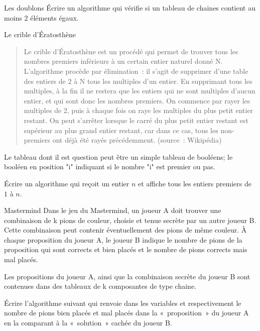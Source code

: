 	\begin{Exercice}{Les doublons}
		Écrire un algorithme qui vérifie 
		si un tableau de chaines
		contient au moins 2 éléments égaux.
	\end{Exercice}	
	\bigskip
	
	\begin{Exercice}{Le crible d’Ératosthène}
		\begin{quote}
			\og{} Le crible d’Ératosthène est un procédé 
			qui permet de trouver tous les nombres premiers inférieurs 
			à un certain entier naturel donné N.
			L’algorithme procède par élimination~: 
			il s’agit de supprimer d’une table des entiers de 2 à N 
			tous les multiples d’un entier. 
			En supprimant tous les multiples, 
			à la fin il ne restera que les entiers qui ne sont multiples d’aucun entier, 
			et qui sont donc les nombres premiers.
			On commence par rayer les multiples de 2, 
			puis à chaque fois on raye les multiples du plus petit entier restant.
			On peut s’arrêter lorsque le carré du plus petit entier restant 
			est supérieur au plus grand entier restant, car dans ce cas, 
			tous les non-premiers ont déjà été rayés précédemment.\fg{}
			(source~: Wikipédia)
		\end{quote}
		Le tableau dont il est question peut être un simple tableau
		de booléens; le booléen en position "i" indiquant 
		si le nombre "i" est premier ou pas.

		Écrire un algorithme qui reçoit un entier $n$
		et affiche tous les entiers premiers de $1$ à $n$.
	\end{Exercice}
	
	\begin{Exercice}{Mastermind}
		Dans le jeu du Mastermind, 
		un joueur A doit trouver une combinaison de k pions de couleur, 
		choisie et tenue secrète par un autre joueur B. 
		Cette combinaison peut contenir éventuellement des pions de même couleur. 
		À chaque proposition du joueur A, 
		le joueur B indique le nombre de pions de la proposition 
		qui sont corrects et bien placés 
		et le nombre de pions corrects mais mal placés. 
		
		Les propositions du joueur A, 
		ainsi que la combinaison secrète du joueur B
		sont contenues dans des tableaux de k composantes de type chaine.
		
		Écrire l’algorithme suivant qui renvoie dans les variables
		 et 
		respectivement le nombre de pions bien placés et mal placés 
		dans la «~proposition~» du joueur A en la comparant 
		à la «~solution~» cachée du joueur B.
	
		\begin{LDA}
		\end{LDA}
	\end{Exercice}
	
